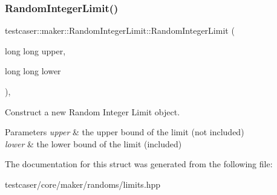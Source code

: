 \subsubsection{\texorpdfstring{RandomIntegerLimit()}{RandomIntegerLimit()}\hspace{0.1cm}{\footnotesize\ttfamily [2/2]}}
{\footnotesize\ttfamily testcaser\+::maker\+::\+Random\+Integer\+Limit\+::\+Random\+Integer\+Limit (\begin{DoxyParamCaption}\item[{long long}]{upper,  }\item[{long long}]{lower }\end{DoxyParamCaption})\hspace{0.3cm}{\ttfamily [inline]}, {\ttfamily [explicit]}}



Construct a new Random Integer Limit object. 


\begin{DoxyParams}{Parameters}
{\em upper} & the upper bound of the limit (not included) \\
\hline
{\em lower} & the lower bound of the limit (included) \\
\hline
\end{DoxyParams}


The documentation for this struct was generated from the following file\+:\begin{DoxyCompactItemize}
\item 
testcaser/core/maker/randoms/limits.\+hpp\end{DoxyCompactItemize}
